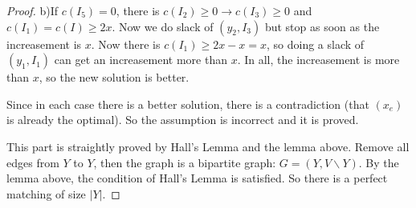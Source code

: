 \begin{proof}
    b)If $c(I_5)=0$, there is $c(I_2)\geq 0\rightarrow c(I_3)\geq 0$ and $c(I_1)=c(I)\geq 2x$. 
    Now we do slack of $(y_2,I_3)$ but stop as soon as the increasement is $x$. 
    Now there is $c(I_1)\geq 2x-x=x$, so doing a slack of $(y_1,I_1)$ can get an increasement more than $x$. 
    In all, the increasement is more than $x$, so the new solution is better. 

    Since in each case there is a better solution, there is a contradiction (that $(x_e)$ is already the optimal). 
    So the assumption is incorrect and it is proved. 
    
    \item This part is straightly proved by Hall's Lemma and the lemma above. Remove all edges from $Y$ to $Y$, 
    then the graph is a bipartite graph: $G=(Y,V\backslash Y)$. By the lemma above, the condition of Hall's Lemma is satisfied. 
    So there is a perfect matching of size $|Y|$. 
    \end{proof}


